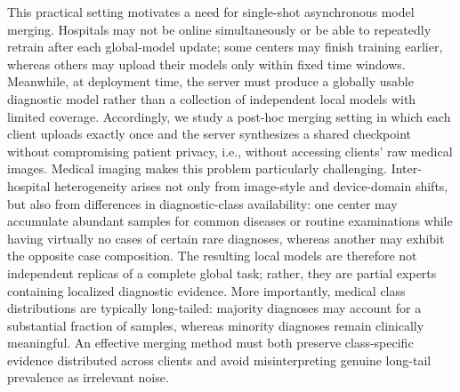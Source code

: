 \documentclass[letterpaper]{article} %
\begin{document}
This practical setting motivates a need for single-shot asynchronous model merging. Hospitals may not be online simultaneously or be able to repeatedly retrain after each global-model update; some centers may finish training earlier, whereas others may upload their models only within fixed time windows. Meanwhile, at deployment time, the server must produce a globally usable diagnostic model rather than a collection of independent local models with limited coverage. Accordingly, we study a post-hoc merging setting in which each client uploads exactly once and the server synthesizes a shared checkpoint without compromising patient privacy, i.e., without accessing clients’ raw medical images.
Medical imaging makes this problem particularly challenging. Inter-hospital heterogeneity arises not only from image-style and device-domain shifts, but also from differences in diagnostic-class availability: one center may accumulate abundant samples for common diseases or routine examinations while having virtually no cases of certain rare diagnoses, whereas another may exhibit the opposite case composition. The resulting local models are therefore not independent replicas of a complete global task; rather, they are partial experts containing localized diagnostic evidence. More importantly, medical class distributions are typically long-tailed: majority diagnoses may account for a substantial fraction of samples, whereas minority diagnoses remain clinically meaningful. An effective merging method must both preserve class-specific evidence distributed across clients and avoid misinterpreting genuine long-tail prevalence as irrelevant noise.
\end{document}
